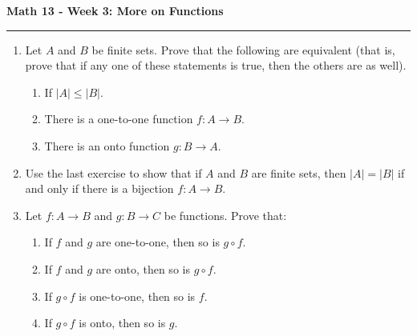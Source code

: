 \documentclass[12pt]{report}
\theoremstyle{definition}
\begin{document}
\begin{center}
{\bf \Large Math 13 - Week 3: More on Functions}
\vspace{0.2cm}
\hrule
\end{center}

\begin{enumerate}	



	\item Let $A$ and $B$ be finite sets. Prove that the following are equivalent (that is, prove that if any one of these statements is true, then the others are as well).
	\begin{enumerate}
		\item If $|A|\leq |B|$.
		\item There is a one-to-one function $f: A\to B$.
		\item There is an onto function $g: B\to A$.
	\end{enumerate}

	\vfill

	\item Use the last exercise to show that if $A$ and $B$ are finite sets, then $|A| = |B|$ if and only if there is a bijection $f: A\to B$.

	\vfill

	\item Let $f: A\to B$ and $g: B\to C$ be functions. Prove that:
	\begin{enumerate}
		\item If $f$ and $g$ are one-to-one, then so is $g\circ f$.
		\item If $f$ and $g$ are onto, then so is $g\circ f$.
		\item If $g\circ f$ is one-to-one, then so is $f$.
		\item If $g\circ f$ is onto, then so is $g$.
	\end{enumerate}

	\vfill

\end{enumerate}
\end{document}
